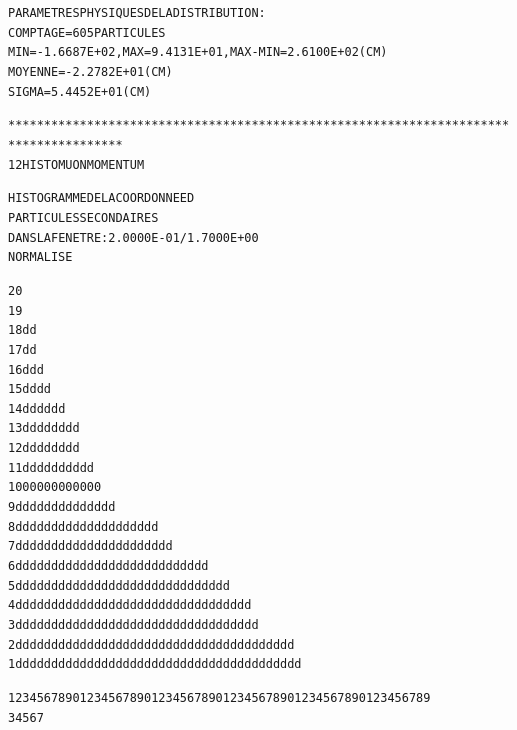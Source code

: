 \begin{alltt}
                PARAMETRES  PHYSIQUES  DE  LA  DISTRIBUTION :
                         COMPTAGE =    605  PARTICULES
                         MIN= -1.6687E+02, MAX = 9.4131E+01, MAX-MIN = 2.6100E+02 (CM) 
                         MOYENNE = -2.2782E+01 (CM) 
                         SIGMA =  5.4452E+01 (CM) 

**************************************************************************************
     12  HISTO     MUON      MOMENTUM

                         HISTOGRAMME  DE  LA  COORDONNEE    D  
                         PARTICULES  SECONDAIRES               
                         DANS  LA  FENETRE :   2.0000E-01 /   1.7000E+00      
                         NORMALISE     

 20                                                                            
 19                                                                            
 18                                      d   d                                 
 17                                      d   d                                 
 16                                      d   dd                                
 15                                     dd   dd                                
 14                                    ddd d dd                                
 13                                    ddd d dd     dd                         
 12                                    ddd d dd     dd                         
 11                                    ddd d ddd d  dd                         
 10                                   0000 0 000 0  00                         
  9                                  ddddd ddddd dd dd                         
  8                                 ddddddddddddddd ddddd                           
  7                                 dddddddddddddddddddddd                          
  6                                dddddddddddddddddddddddd ddd                     
  5                               dddddddddddddddddddddddddddddd                    
  4                             ddddddddddddddddddddddddddddddddd                   
  3                             ddddddddddddddddddddddddddddddddd  d                
  2                            ddddddddddddddddddddddddddddddddddd dddd             
  1                            dddddddddddddddddddddddddddddddddddddddd             

                         12345678901234567890123456789012345678901234567890123456789
                                  3         4         5         6         7         



\end{alltt}
